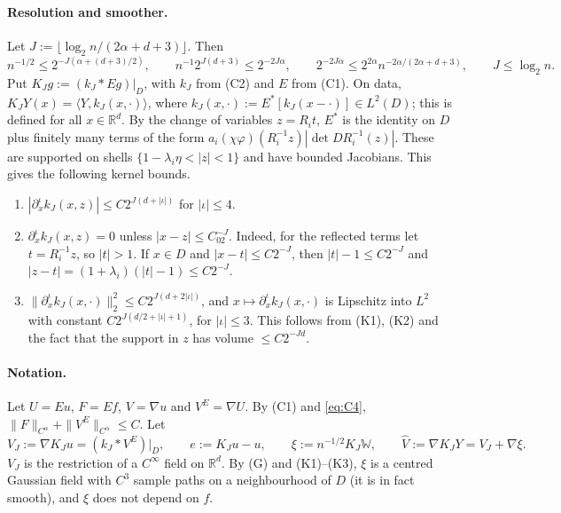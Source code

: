 \documentclass[11pt]{article}
\theoremstyle{definition}
\theoremstyle{remark}
\newcommand{\R}{\mathbb R}
\newcommand{\W}{\mathbb W}
\newcommand{\rate}{n^{-2\alpha/(2\alpha+d+3)}}
\begin{document}
\paragraph{Resolution and smoother.} Let $J:=\lfloor\log_2n/(2\alpha+d+3)\rfloor$. Then
\begin{equation}\label{eq:J}
n^{-1/2}\le2^{-J(\alpha+(d+3)/2)},\qquad n^{-1}2^{J(d+3)}\le2^{-2J\alpha},\qquad 2^{-2J\alpha}\le 2^{2\alpha}\rate,\qquad J\le\log_2n .
\end{equation}
Put $K_Jg:=(k_J*Eg)|_D$, with $k_J$ from (C2) and $E$ from (C1). On data, $K_JY(x)=\langle Y,k_J(x,\cdot)\rangle$, where $k_J(x,\cdot):=E^*[k_J(x-\cdot)]\in L^2(D)$; this is defined for all $x\in\R^d$. By the change of variables $z=R_it$, $E^*$ is the identity on $D$ plus finitely many terms of the form $a_i(\chi\varphi)(R_i^{-1}z)|\det DR_i^{-1}(z)|$. These are supported on shells $\{1-\lambda_i\eta<|z|<1\}$ and have bounded Jacobians. This gives the following kernel bounds.
\begin{enumerate}[leftmargin=3.2em]
\item[\textbf{(K1)}] $|\partial^\iota_xk_J(x,z)|\le C2^{J(d+|\iota|)}$ for $|\iota|\le4$.
\item[\textbf{(K2)}] $\partial^\iota_xk_J(x,z)=0$ unless $|x-z|\le C_02^{-J}$. Indeed, for the reflected terms let $t=R_i^{-1}z$, so $|t|>1$. If $x\in D$ and $|x-t|\le C2^{-J}$, then $|t|-1\le C2^{-J}$ and $|z-t|=(1+\lambda_i)(|t|-1)\le C2^{-J}$.
\item[\textbf{(K3)}] $\|\partial^\iota_xk_J(x,\cdot)\|^2_2\le C2^{J(d+2|\iota|)}$, and $x\mapsto\partial_x^\iota k_J(x,\cdot)$ is Lipschitz into $L^2$ with constant $C2^{J(d/2+|\iota|+1)}$, for $|\iota|\le3$. This follows from (K1), (K2) and the fact that the support in $z$ has volume $\le C2^{-Jd}$.
\end{enumerate}

\paragraph{Notation.} Let $U=Eu$, $F=Ef$, $V=\nabla u$ and $V^E=\nabla U$. By (C1) and \eqref{eq:C4}, $\|F\|_{C^\alpha}+\|V^E\|_{C^\alpha}\le C$. Let
\[
V_J:=\nabla K_Ju=(k_J*V^E)|_D,\qquad e:=K_Ju-u,\qquad \xi:=n^{-1/2}K_J\W,\qquad\hat V:=\nabla K_JY=V_J+\nabla\xi .
\]
$V_J$ is the restriction of a $C^\infty$ field on $\R^d$. By (G) and (K1)--(K3), $\xi$ is a centred Gaussian field with $C^3$ sample paths on a neighbourhood of $D$ (it is in fact smooth), and $\xi$ does not depend on $f$.
\end{document}
